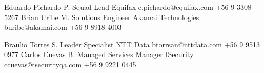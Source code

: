 %
%
%


\begin{referees}
	{Eduardo Pichardo P.}
	{Squad Lead}
	{Equifax}
	{e.pichardo@equifax.com}
	{+56 9 3308 5267}
	{Brian Uribe M.}
	{Solutions Engineer}
	{Akamai Technologies}
	{buribe@akamai.com}
	{+56 9 8918 4003}
\end{referees}

\begin{referees}
	{Braulio Torres S.}
	{Leader Specialist}
	{NTT Data}
	{btorrsan@nttdata.com}
	{+56 9 9513 0977}
	{Carlos Cuevas B.}
	{Managed Services Manager}
	{ISecurity}
	{ccuevas@isecurityqa.com}
	{+56 9 9221 0445}
\end{referees}

